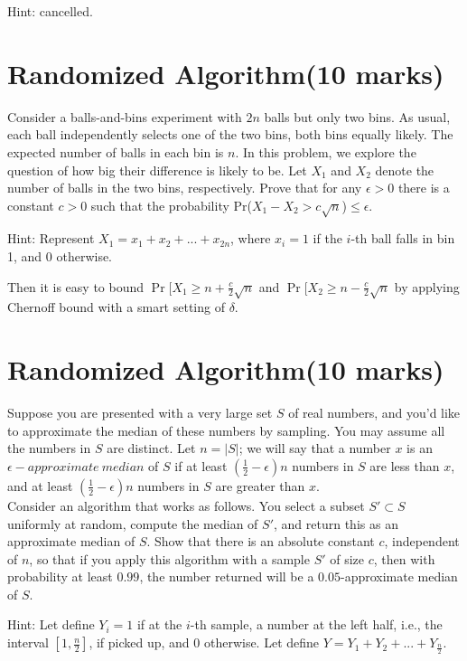 \documentclass[a4paper,11pt]{article}
\begin{document}
Hint: cancelled. 

\section{Randomized Algorithm(10 marks)}

Consider a balls-and-bins experiment with $2n$ balls but only two bins. As usual, each ball independently selects one of the two bins, both bins equally likely. The expected number of balls in each bin is $n$. In this problem, we explore the question of how big their difference is likely to be. Let $X_1$ and $X_2$ denote the number of balls in the two bins, respectively. Prove that for any $\epsilon >0$ there is a constant $c>0$ such that the probability Pr($X_1-X_2>c\sqrt {n}$)$\leq \epsilon$.

Hint: Represent $X_1= x_1+x_2+...+x_{2n}$, where $x_i=1$ if the $i$-th ball falls in bin 1, and $0$ otherwise.

Then it is easy to bound $\Pr[ X_1 \geq n + \frac{c}{2} \sqrt{n}$ and $\Pr[ X_2 \geq n - \frac{c}{2} \sqrt{n}$ by applying Chernoff bound with a smart setting of $\delta$. 


\section{Randomized Algorithm(10 marks)}

Suppose you are presented with a very large set $S$ of real numbers, and you'd like to approximate the median of these numbers by sampling. You may assume all the numbers in $S$ are distinct. Let $n=|S|$; we will say that a number $x$ is an $\epsilon -approximate\ median$ of $S$ if at least $(\frac{1}{2}-\epsilon)n$ numbers in $S$ are less than $x$, and at least $(\frac{1}{2}-\epsilon)n$ numbers in $S$ are greater than $x$.\\

		Consider an algorithm that works as follows. You select a subset $S'\subset S$ uniformly at random, compute the median of $S'$, and return this as an approximate median of $S$. Show that there is an absolute constant $c$, independent of $n$, so that if you apply this algorithm with a sample $S'$ of size $c$, then with probability at least $0.99$, the number returned will be a $0.05$-approximate median of $S$.

Hint: Let define $Y_i = 1 $ if at the $i$-th sample, a number at the left half, i.e., the interval $[1,\frac{n}{2}]$, if picked up, and $0$ otherwise. Let define $Y=Y_1+Y_2+...+Y_{\frac{n}{2}}$. 
\end{document}
